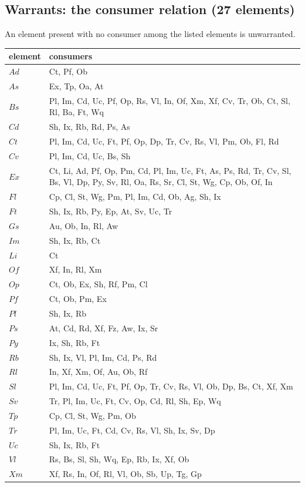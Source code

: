 \subsection{Warrants: the consumer relation (27 elements)}

An element present with no consumer among the listed elements is unwarranted.

\begin{longtable}{ll}
\toprule
element & consumers\\
\midrule\endhead
$Ad$ & Ct, Pf, Ob\\
$As$ & Ex, Tp, Oa, At\\
$Bs$ & Pl, Im, Cd, Uc, Pf, Op, Rs, Vl, In, Of, Xm, Xf, Cv, Tr, Ob, Ct, Sl, Rl, Ba, Ft, Wq\\
$Cd$ & Sh, Ix, Rb, Rd, Ps, As\\
$Ct$ & Pl, Im, Cd, Uc, Ft, Pf, Op, Dp, Tr, Cv, Rs, Vl, Pm, Ob, Fl, Rd\\
$Cv$ & Pl, Im, Cd, Uc, Bs, Sh\\
$Ex$ & Ct, Li, Ad, Pf, Op, Pm, Cd, Pl, Im, Uc, Ft, As, Ps, Rd, Tr, Cv, Sl, Bs, Vl, Dp, Py, Sv, Rl, Oa, Rs, Sr, Cl, St, Wg, Cp, Ob, Of, In\\
$Fl$ & Cp, Cl, St, Wg, Pm, Pl, Im, Cd, Ob, Ag, Sh, Ix\\
$Ft$ & Sh, Ix, Rb, Py, Ep, At, Sv, Uc, Tr\\
$Gs$ & Au, Ob, In, Rl, Aw\\
$Im$ & Sh, Ix, Rb, Ct\\
$Li$ & Ct\\
$Of$ & Xf, In, Rl, Xm\\
$Op$ & Ct, Ob, Ex, Sh, Rf, Pm, Cl\\
$Pf$ & Ct, Ob, Pm, Ex\\
$Pl$ & Sh, Ix, Rb\\
$Ps$ & At, Cd, Rd, Xf, Fz, Aw, Ix, Sr\\
$Py$ & Ix, Sh, Rb, Ft\\
$Rb$ & Sh, Ix, Vl, Pl, Im, Cd, Ps, Rd\\
$Rl$ & In, Xf, Xm, Of, Au, Ob, Rf\\
$Sl$ & Pl, Im, Cd, Uc, Ft, Pf, Op, Tr, Cv, Rs, Vl, Ob, Dp, Bs, Ct, Xf, Xm\\
$Sv$ & Tr, Pl, Im, Uc, Ft, Cv, Op, Cd, Rl, Sh, Ep, Wq\\
$Tp$ & Cp, Cl, St, Wg, Pm, Ob\\
$Tr$ & Pl, Im, Uc, Ft, Cd, Cv, Rs, Vl, Sh, Ix, Sv, Dp\\
$Uc$ & Sh, Ix, Rb, Ft\\
$Vl$ & Rs, Bs, Sl, Sh, Wq, Ep, Rb, Ix, Xf, Ob\\
$Xm$ & Xf, Rs, In, Of, Rl, Vl, Ob, Sb, Up, Tg, Gp\\
\bottomrule
\end{longtable}

